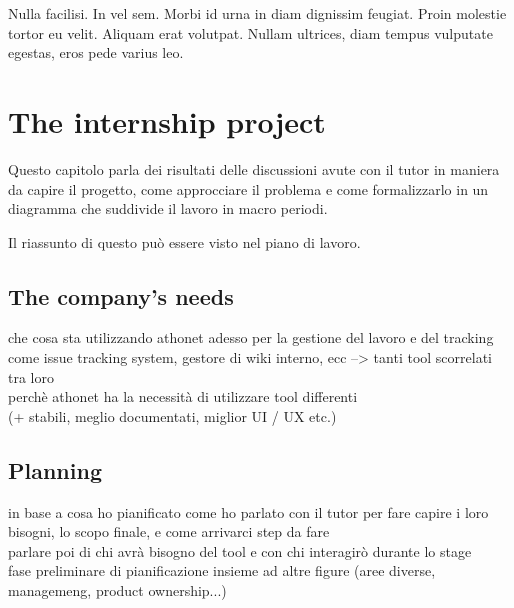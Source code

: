 \begin{savequote}[75mm]
Nulla facilisi. In vel sem. Morbi id urna in diam dignissim feugiat. Proin molestie tortor eu velit. Aliquam erat volutpat. Nullam ultrices, diam tempus vulputate egestas, eros pede varius leo.
\end{savequote}

\chapter{The internship project}



Questo capitolo parla dei risultati delle discussioni avute con il tutor in maniera da capire il progetto, come approcciare il problema e come formalizzarlo in un diagramma che suddivide il lavoro in macro periodi.

Il riassunto di questo può essere visto nel piano di lavoro.

\section{The company's needs}
che cosa sta utilizzando athonet adesso per la gestione del lavoro e del tracking\\
come issue tracking system, gestore di wiki interno, ecc --> tanti tool scorrelati tra loro\\
perchè athonet ha la necessità di utilizzare tool differenti \\
(+ stabili, meglio documentati, miglior UI / UX etc.)

\section{Planning}
in base a cosa ho pianificato
come ho parlato con il tutor per fare capire i loro bisogni, lo scopo finale, e come arrivarci
step da fare\\
parlare poi di chi avrà bisogno del tool e con chi interagirò durante lo stage\\
fase preliminare di pianificazione insieme ad altre figure (aree diverse, managemeng, product ownership...)

